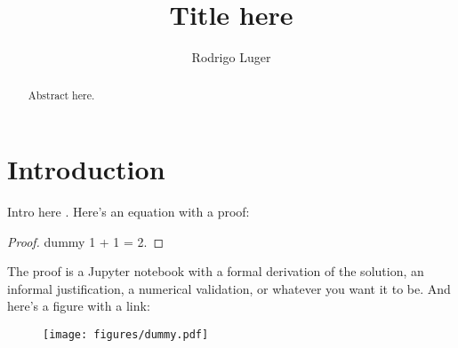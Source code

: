 \documentclass[modern]{aastex62}
\begin{document}
\title{Title here}

\author[0000-0002-0296-3826]{Rodrigo Luger}
%

\begin{abstract} 
Abstract here.
%
\href{https://github.com/rodluger/starrynight}{\color{linkcolor}\faGithub}
\end{abstract}

%
\section{Introduction}
%
Intro here \citep{Luger2019}.
Here's an equation with a proof:
%
\begin{proof}{dummy}
    \label{eq:dummy}
    1 + 1 = 2.
\end{proof}
The proof is a Jupyter notebook with a formal derivation of the solution,
an informal justification, a numerical validation, or whatever you want it
to be.
%
And here's a figure with a link:
%
\begin{figure}[h!]
    \begin{centering}
    \texttt{[image: figures/dummy.pdf]}
    \end{centering}
\end{figure}


\end{document}
